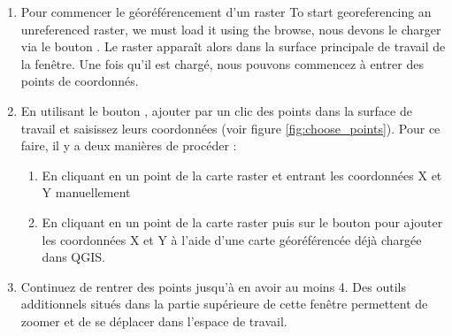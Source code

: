 \label{georeferencer_entering}

\begin{enumerate}
\item Pour commencer le géoréférencement d'un raster To start georeferencing an unreferenced raster, we must load it using the \browsebutton browse, nous devons le charger via le bouton \browsebutton. Le raster apparaît alors dans la surface principale de travail de la fenêtre. Une fois qu'il est chargé, nous pouvons commencez à entrer des points de coordonnés.

\item En utilisant le bouton , ajouter par un clic des points dans la surface de travail et saisissez leurs coordonnées (voir figure \ref{fig:choose_points}). Pour ce faire, il y a deux manières de procéder :


\begin{enumerate}
\item En cliquant en un point de la carte raster et entrant les coordonnées X et Y manuellement
\item En cliquant en un point de la carte raster puis sur le bouton  pour ajouter les coordonnées X et Y à l'aide d'une carte géoréférencée déjà chargée dans QGIS.
\end{enumerate}
\item Continuez de rentrer des points jusqu'à en avoir au moins 4. Des outils additionnels situés dans la partie supérieure de cette fenêtre permettent de zoomer et de se déplacer dans l'espace de travail.
\end{enumerate}

